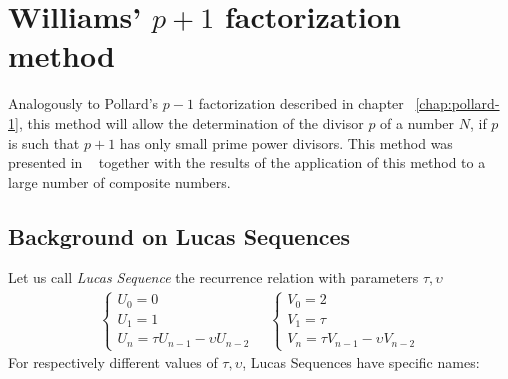 \chapter{Williams' $p+1$ factorization method \label{chap:william+1}}

Analogously to Pollard's $p-1$ factorization described in chapter
~\ref{chap:pollard-1}, this method will allow the determination of the divisor
$p$ of a number $N$, if $p$ is such that $p+1$ has only small prime power
divisors.
This method was presented in ~\cite{Williams:p+1} together with the results of
the application of this method to a large number of composite numbers.

\section{Background on Lucas Sequences}

Let us call \emph{Lucas Sequence} the recurrence relation with parameters $\tau,
\upsilon$
\begin{align*}
  \begin{cases}
    U_0 = 0 \\
    U_1 = 1 \\
    U_n = \tau U_{n-1} - \upsilon U_{n-2}
  \end{cases}
  \quad
  \begin{cases}
    V_0 = 2 \\
    V_1 = \tau \\
    V_n = \tau V_{n-1} - \upsilon V_{n-2}
  \end{cases}
\end{align*}
For respectively different values of $\tau, \upsilon$, Lucas Sequences have
specific names:

